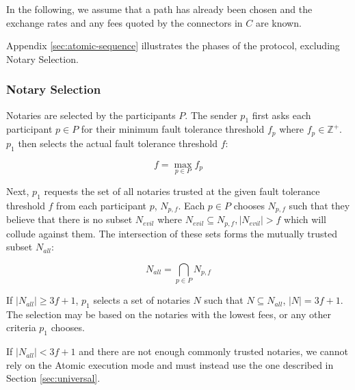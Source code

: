 \documentclass[letterpaper,twocolumn,10pt]{article}
\begin{document}
In the following, we assume that a path has already been chosen and the exchange rates and any fees quoted by the connectors in $C$ are known.

Appendix \ref{sec:atomic-sequence} illustrates the phases of the protocol, excluding Notary Selection.

\subsubsection{Notary Selection}
\label{subsec:notary-selection}


Notaries are selected by the participants $P$. The sender $p_1$ first asks each participant $p \in P$  for their minimum fault tolerance threshold $f_p$ where $f_p \in \mathbb{Z}^+$. $p_1$ then selects the actual fault tolerance threshold $f$:

\begin{equation}
f = \max_{p \in P} f_p
\end{equation}

Next, $p_1$ requests the set of all notaries trusted at the given fault tolerance threshold $f$ from each participant $p$, $N_{p,f}$. Each $p \in P$ chooses $N_{p,f}$ such that they believe that there is no subset $N_{evil}$ where $N_{evil} \subseteq N_{p,f}, |N_{evil}| > f$ which will collude against them. The intersection of these sets forms the mutually trusted subset $N_{all}$:

\begin{equation}
N_{all} = \bigcap_{p \in P} N_{p,f}
\end{equation}

If $|N_{all}| \geq 3f+1$, $p_1$ selects a set of notaries $N$ such that $N \subseteq N_{all}$, $|N| = 3f + 1$. The selection may be based on the notaries with the lowest fees, or any other criteria $p_1$ chooses. 

If $|N_{all}| < 3f+1$ and there are not enough commonly trusted notaries, we cannot rely on the Atomic execution mode and must instead use the one described in Section \ref{sec:universal}.
\end{document}
